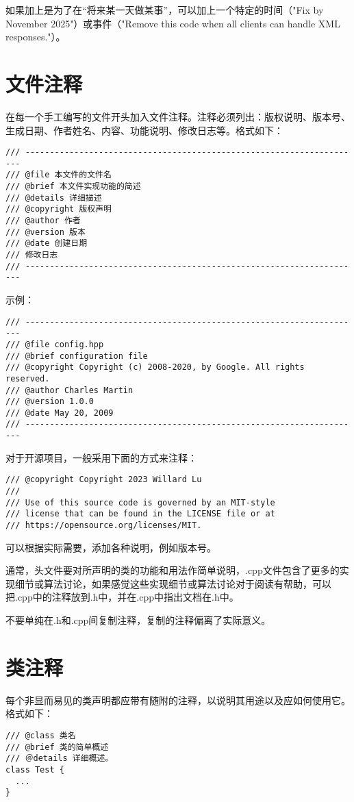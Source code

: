 如果加上是为了在“将来某一天做某事”，可以加上一个特定的时间（"Fix by November 2025"）或事件（"Remove this code when all clients can handle XML responses."）。


\section{文件注释}
在每一个手工编写的文件开头加入文件注释。注释必须列出：版权说明、版本号、生成日期、作者姓名、内容、功能说明、修改日志等。格式如下：
\begin{verbatim}
/// ---------------------------------------------------------------------
/// @file 本文件的文件名
/// @brief 本文件实现功能的简述
/// @details 详细描述
/// @copyright 版权声明
/// @author 作者
/// @version 版本
/// @date 创建日期
/// 修改日志
/// ---------------------------------------------------------------------
\end{verbatim}

示例：
\begin{verbatim}
/// ---------------------------------------------------------------------
/// @file config.hpp
/// @brief configuration file
/// @copyright Copyright (c) 2008-2020, by Google. All rights reserved.
/// @author Charles Martin
/// @version 1.0.0
/// @date May 20, 2009
/// ---------------------------------------------------------------------
\end{verbatim}

对于开源项目，一般采用下面的方式来注释：
\begin{verbatim}
/// @copyright Copyright 2023 Willard Lu
///
/// Use of this source code is governed by an MIT-style
/// license that can be found in the LICENSE file or at
/// https://opensource.org/licenses/MIT.
\end{verbatim}
可以根据实际需要，添加各种说明，例如版本号。

通常，头文件要对所声明的类的功能和用法作简单说明，.cpp文件包含了更多的实现细节或算法讨论，如果感觉这些实现细节或算法讨论对于阅读有帮助，可以把.cpp中的注释放到.h中，并在.cpp中指出文档在.h中。

不要单纯在.h和.cpp间复制注释，复制的注释偏离了实际意义。


\section{类注释}
每个非显而易见的类声明都应带有随附的注释，以说明其用途以及应如何使用它。格式如下：
\begin{verbatim}
/// @class 类名
/// @brief 类的简单概述
/// ＠details 详细概述。
class Test {
  ...
}
\end{verbatim}

